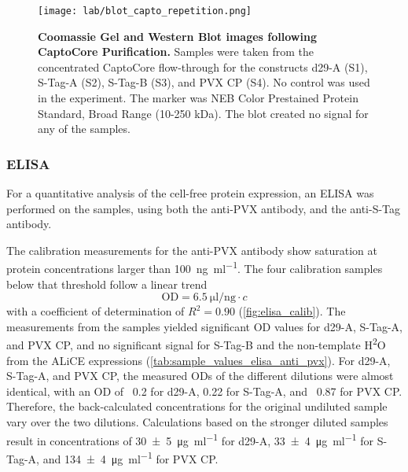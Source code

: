 \begin{figure}
\texttt{[image: lab/blot\_capto\_repetition.png]}
\caption{\textbf{Coomassie Gel and Western Blot images following CaptoCore Purification.} Samples were taken from the concentrated CaptoCore flow-through for the constructs d29-A (S1), S-Tag-A (S2), S-Tag-B (S3), and PVX CP (S4). No control was used in the experiment. The marker was NEB Color Prestained Protein Standard, Broad Range (10-250 kDa). The blot created no signal for any of the samples. }
\label{fig:blot_capto_repetition}
\end{figure}


\label{subsection:elisa}
\subsubsection{ELISA}
For a quantitative analysis of the cell-free protein expression, an ELISA was performed on the samples, using both the anti-PVX antibody, and the anti-S-Tag antibody. 

The calibration measurements for the anti-PVX antibody show saturation at protein concentrations larger than \SI{100}{\nano\gram\per\milli\litre}. The four calibration samples below that threshold follow a linear trend 
\begin{equation}
\text{OD} = \SI{6.5}{\micro\litre\per\nano\gram} \cdot c
\end{equation}
with a coefficient of determination of $R^2=0.90$ (\autoref{fig:elisa_calib}). The measurements from the samples yielded significant OD values for d29-A, S-Tag-A, and PVX CP, and no significant signal for S-Tag-B and the non-template H\textsuperscript{2}O from the ALiCE expressions (\autoref{tab:sample_values_elisa_anti_pvx}). For d29-A, S-Tag-A, and PVX CP, the measured ODs of the different dilutions were almost identical, with an OD of ~0.2 for d29-A, 0.22 for S-Tag-A, and ~0.87 for PVX CP. Therefore, the back-calculated concentrations for the original undiluted sample vary over the two dilutions. Calculations based on the stronger diluted samples result in concentrations of \SI{30\pm 5}{\micro\gram\per\milli\litre} for d29-A, \SI{33\pm 4}{\micro\gram\per\milli\litre} for S-Tag-A, and \SI{134\pm 4}{\micro\gram\per\milli\litre} for PVX CP. 

